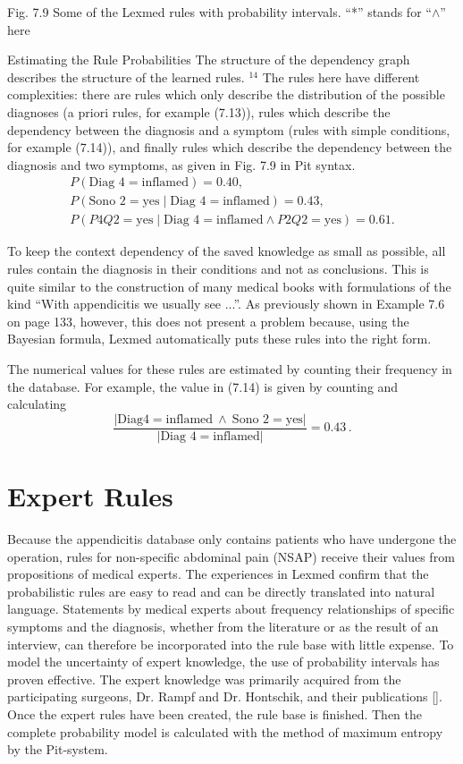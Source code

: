 \documentclass[10pt]{book}
\begin{document}
Fig. 7.9 Some of the Lexmed rules with probability intervals. ``*'' stands for ``$\wedge$'' here

Estimating the Rule Probabilities The structure of the dependency graph describes the structure of the learned rules. ${ }^{14}$ The rules here have different complexities: there are rules which only describe the distribution of the possible diagnoses (a priori rules, for example (7.13)), rules which describe the dependency between the diagnosis and a symptom (rules with simple conditions, for example (7.14)), and finally rules which describe the dependency between the diagnosis and two symptoms, as given in Fig. 7.9 in Pit syntax.
\[
\begin{array}{r}
P(\text{Diag }4=\text{inflamed})=0.40,\\
P(\text{Sono }2=\text{yes}\mid \text{Diag }4=\text{inflamed})=0.43,\\
P(P4Q2=\text{yes}\mid \text{Diag }4=\text{inflamed}\wedge P2Q2=\text{yes})=0.61.
\end{array}
\tag{7.15}
\]

To keep the context dependency of the saved knowledge as small as possible, all rules contain the diagnosis in their conditions and not as conclusions. This is quite similar to the construction of many medical books with formulations of the kind ``With appendicitis we usually see ...''. As previously shown in Example 7.6 on page 133, however, this does not present a problem because, using the Bayesian formula, Lexmed automatically puts these rules into the right form.

The numerical values for these rules are estimated by counting their frequency in the database. For example, the value in (7.14) is given by counting and calculating
\[
\frac{\lvert \text{Diag4}=\text{inflamed}\ \wedge\ \text{Sono }2=\text{yes}\rvert}{\lvert \text{Diag }4=\text{inflamed}\rvert}=0.43\,.
\]

\section{Expert Rules}
Because the appendicitis database only contains patients who have undergone the operation, rules for non-specific abdominal pain (NSAP) receive their values from propositions of medical experts. The experiences in Lexmed confirm that the probabilistic rules are easy to read and can be directly translated into natural language. Statements by medical experts about frequency relationships of specific symptoms and the diagnosis, whether from the literature or as the result of an interview, can therefore be incorporated into the rule base with little expense. To model the uncertainty of expert knowledge, the use of probability intervals has proven effective. The expert knowledge was primarily acquired from the participating surgeons, Dr. Rampf and Dr. Hontschik, and their publications [\cite{hontschik1994appendektomie}].
Once the expert rules have been created, the rule base is finished. Then the complete probability model is calculated with the method of maximum entropy by the Pit-system.
\end{document}
